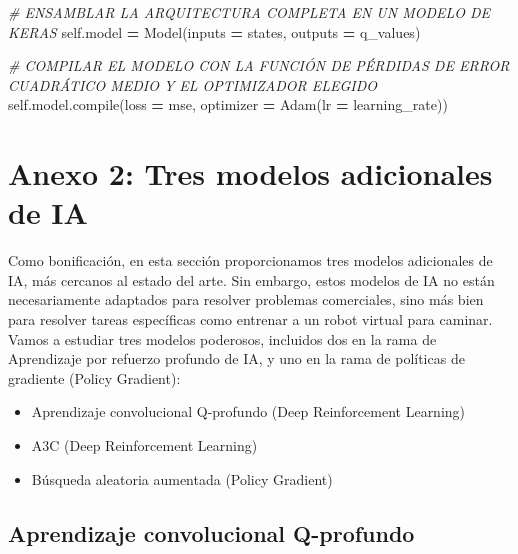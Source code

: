 \documentclass[
]{book}
\newenvironment{Shaded}{\begin{snugshade}}{\end{snugshade}}
\newcommand{\BuiltInTok}[1]{#1}
\newcommand{\CommentTok}[1]{\textcolor[rgb]{0.56,0.35,0.01}{\textit{#1}}}
\newcommand{\NormalTok}[1]{#1}
\newcommand{\OperatorTok}[1]{\textcolor[rgb]{0.81,0.36,0.00}{\textbf{#1}}}
\newcommand{\StringTok}[1]{\textcolor[rgb]{0.31,0.60,0.02}{#1}}
\newcommand{\VariableTok}[1]{\textcolor[rgb]{0.00,0.00,0.00}{#1}}
\providecommand{\tightlist}{%
  \setlength{\itemsep}{0pt}\setlength{\parskip}{0pt}}
\begin{document}
\begin{Shaded}
\begin{Highlighting}[]
        \CommentTok{\# ENSAMBLAR LA ARQUITECTURA COMPLETA EN UN MODELO DE KERAS}
        \VariableTok{self}\NormalTok{.model }\OperatorTok{=}\NormalTok{ Model(inputs }\OperatorTok{=}\NormalTok{ states, outputs }\OperatorTok{=}\NormalTok{ q\_values)}
        
        \CommentTok{\# COMPILAR EL MODELO CON LA FUNCIÓN DE PÉRDIDAS DE ERROR CUADRÁTICO MEDIO Y EL OPTIMIZADOR ELEGIDO}
        \VariableTok{self}\NormalTok{.model.}\BuiltInTok{compile}\NormalTok{(loss }\OperatorTok{=} \StringTok{\textquotesingle{}mse\textquotesingle{}}\NormalTok{, optimizer }\OperatorTok{=}\NormalTok{ Adam(lr }\OperatorTok{=}\NormalTok{ learning\_rate))}
\end{Highlighting}
\end{Shaded}

\hypertarget{anexo-2-tres-modelos-adicionales-de-ia}{%
\section{Anexo 2: Tres modelos adicionales de IA}\label{anexo-2-tres-modelos-adicionales-de-ia}}

Como bonificación, en esta sección proporcionamos tres modelos adicionales de IA, más cercanos al estado del arte. Sin embargo, estos modelos de IA no están necesariamente adaptados para resolver problemas comerciales, sino más bien para resolver tareas específicas como entrenar a un robot virtual para caminar. Vamos a estudiar tres modelos poderosos, incluidos dos en la rama de Aprendizaje por refuerzo profundo de IA, y uno en la rama de políticas de gradiente (Policy Gradient):

\begin{itemize}
\tightlist
\item
  Aprendizaje convolucional Q-profundo (Deep Reinforcement Learning)
\item
  A3C (Deep Reinforcement Learning)
\item
  Búsqueda aleatoria aumentada (Policy Gradient)
\end{itemize}

\hypertarget{aprendizaje-convolucional-q-profundo}{%
\subsection{Aprendizaje convolucional Q-profundo}\label{aprendizaje-convolucional-q-profundo}}
\end{document}
